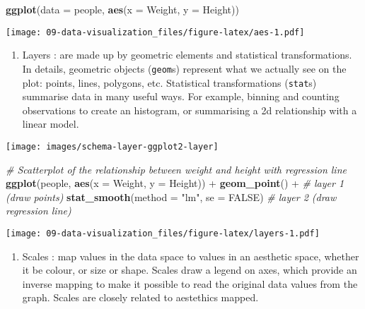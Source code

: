 \documentclass[]{book}
\newenvironment{Shaded}{\begin{snugshade}}{\end{snugshade}}
\newcommand{\KeywordTok}[1]{\textcolor[rgb]{0.13,0.29,0.53}{\textbf{{#1}}}}
\newcommand{\DataTypeTok}[1]{\textcolor[rgb]{0.13,0.29,0.53}{{#1}}}
\newcommand{\StringTok}[1]{\textcolor[rgb]{0.31,0.60,0.02}{{#1}}}
\newcommand{\CommentTok}[1]{\textcolor[rgb]{0.56,0.35,0.01}{\textit{{#1}}}}
\newcommand{\OtherTok}[1]{\textcolor[rgb]{0.56,0.35,0.01}{{#1}}}
\newcommand{\NormalTok}[1]{{#1}}
\providecommand{\tightlist}{%
  \setlength{\itemsep}{0pt}\setlength{\parskip}{0pt}}
\def\tightlist{}
\begin{document}
\begin{Shaded}
\begin{Highlighting}[]
\KeywordTok{ggplot}\NormalTok{(}\DataTypeTok{data =} \NormalTok{people, }\KeywordTok{aes}\NormalTok{(}\DataTypeTok{x =} \NormalTok{Weight, }\DataTypeTok{y =} \NormalTok{Height))}
\end{Highlighting}
\end{Shaded}

\texttt{[image: 09-data-visualization\_files/figure-latex/aes-1.pdf]}

\begin{enumerate}
\def\labelenumi{\arabic{enumi}.}
\setcounter{enumi}{2}
\tightlist
\item
   {Layers} : are made up by geometric elements and statistical
  transformations. In details, geometric objects (\texttt{geom}s)
  represent what we actually see on the plot: points, lines, polygons,
  etc. Statistical transformations (\texttt{stat}s) summarise data in
  many useful ways. For example, binning and counting observations to
  create an histogram, or summarising a 2d relationship with a linear
  model.
\end{enumerate}

\texttt{[image: images/schema-layer-ggplot2-layer]}

\begin{Shaded}
\begin{Highlighting}[]
\CommentTok{# Scatterplot of the relationship between weight and height with regression line}
\KeywordTok{ggplot}\NormalTok{(people, }\KeywordTok{aes}\NormalTok{(}\DataTypeTok{x =} \NormalTok{Weight, }\DataTypeTok{y =} \NormalTok{Height)) +}
\StringTok{  }\KeywordTok{geom_point}\NormalTok{() +}\StringTok{ }\CommentTok{# layer 1 (draw points)}
\StringTok{  }\KeywordTok{stat_smooth}\NormalTok{(}\DataTypeTok{method =} \StringTok{"lm"}\NormalTok{, }\DataTypeTok{se =} \OtherTok{FALSE}\NormalTok{) }\CommentTok{# layer 2 (draw regression line) }
\end{Highlighting}
\end{Shaded}

\texttt{[image: 09-data-visualization\_files/figure-latex/layers-1.pdf]}

\begin{enumerate}
\def\labelenumi{\arabic{enumi}.}
\setcounter{enumi}{3}
\tightlist
\item
   {Scales} : map values in the data space to values in an aesthetic
  space, whether it be colour, or size or shape. Scales draw a legend on
  axes, which provide an inverse mapping to make it possible to read the
  original data values from the graph. Scales are closely related to
  aestethics mapped.
\end{enumerate}
\end{document}
